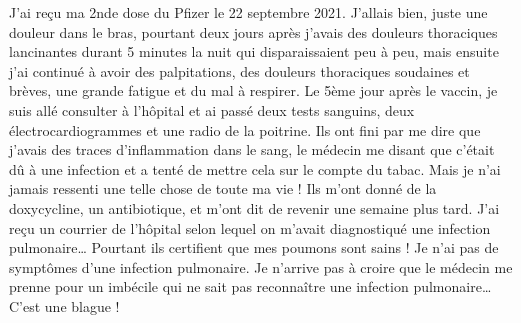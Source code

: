 J'ai reçu ma 2nde dose du Pfizer le 22 septembre 2021. J'allais bien, juste une
douleur dans le bras, pourtant deux jours après j'avais des douleurs thoraciques
lancinantes durant 5 minutes la nuit qui disparaissaient peu à peu, mais ensuite
j'ai continué à avoir des palpitations, des douleurs thoraciques soudaines et
brèves, une grande fatigue et du mal à respirer. Le 5ème jour après le vaccin,
je suis allé consulter à l'hôpital et ai passé deux tests sanguins, deux
électrocardiogrammes et une radio de la poitrine. Ils ont fini par me dire que
j'avais des traces d'inflammation dans le sang, le médecin me disant que c'était
dû à une infection et a tenté de mettre cela sur le compte du tabac. Mais je
n'ai jamais ressenti une telle chose de toute ma vie ! Ils m'ont donné de la
doxycycline, un antibiotique, et m'ont dit de revenir une semaine plus
tard. J'ai reçu un courrier de l'hôpital selon lequel on m'avait diagnostiqué
une infection pulmonaire… Pourtant ils certifient que mes poumons sont sains !
Je n'ai pas de symptômes d'une infection pulmonaire. Je n'arrive pas à croire
que le médecin me prenne pour un imbécile qui ne sait pas reconnaître une
infection pulmonaire… C'est une blague !

